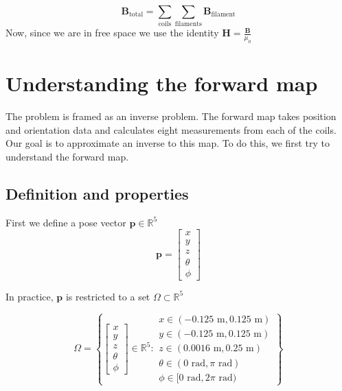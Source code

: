 \begin{equation*}
\mathbf{B}_{\text{total}} = \sum_{\text{coils}} \sum_{\text{filaments}}  \mathbf{B}_{\text{filament}} 
\end{equation*}
Now, since we are in free space we use the identity $\mathbf{H} = \frac{\mathbf{B}}{\mu_0}$ \cite[p.~285]{griffiths2013}

\section{Understanding the forward map}\label{sec:forward-map}
The problem is framed as an inverse problem. The forward map takes position and orientation data and calculates eight measurements from each of the coils. Our goal is to approximate an inverse to this map. To do this, we first try to understand the forward map. 
\subsection{Definition and properties}
First we define a pose vector $\mathbf{p} \in \mathbb{R}^5$ 
\begin{equation}
  \mathbf{p} = 
  \begin{bmatrix}
    x \\ y \\ z \\ \theta \\ \phi 
  \end{bmatrix}
\end{equation}

In practice, $\mathbf{p}$ is restricted to a set $\Omega \subset \mathbb{R}^5$

\begin{equation}
  \Omega = \left\{
  \begin{bmatrix} x \\ y \\ z \\ \theta \\ \phi \end{bmatrix} \in \mathbb{R}^5 : 
  \begin{matrix} x \in (-0.125\text{ m},0.125\text{ m}) \\ y \in (-0.125\text{ m},0.125\text{ m}) \\ z \in (0.0016 \text{ m},0.25\text{ m}) \\ \theta \in (0\text{ rad},\pi\text{ rad}) \\ \phi \in [0\text{ rad},2\pi\text{ rad}) \end{matrix}
  \right\}
\end{equation}

